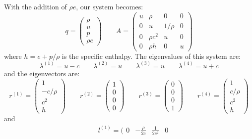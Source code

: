 \begin{itemize}
With the addition of $\rho e$, our system becomes:
\begin{equation}
q = \left ( \begin{array}{c} \rho \\ u \\ p \\ \rho e \end{array} \right )
%
\qquad
%
A = \left ( \begin{array}{cccc} u & \rho     & 0      & 0 \\
                                0 & u        & 1/\rho & 0 \\
                                0 & \rho c^2 & u      & 0 \\
                                0 & \rho h   & 0      & u 
            \end{array} \right )
\end{equation}
where $h = e + p/\rho$ is the specific enthalpy.  The eigenvalues of this 
system are:
\begin{equation}
\lambda^{(1)} = u - c \qquad 
\lambda^{(2)} = u  \qquad 
\lambda^{(3)} = u  \qquad 
\lambda^{(4)} = u + c 
\end{equation}
and the eigenvectors are:
\begin{equation}
r^{(1)} = \left ( \begin{array}{c} 1 \\ -c/\rho \\ c^2 \\ h \end{array} \right )
\qquad
r^{(2)} = \left ( \begin{array}{c} 1 \\ 0 \\ 0 \\ 0 \end{array} \right )
\qquad
r^{(3)} = \left ( \begin{array}{c} 0 \\ 0 \\ 0 \\ 1 \end{array} \right )
\qquad
r^{(4)} = \left ( \begin{array}{c} 1 \\ c/\rho \\ c^2 \\ h \end{array} \right )
\end{equation}
and
\begin{eqnarray}
&&
l^{(1)} = ( \begin{array}{cccc} 0 & -\frac{\rho}{2c} & \frac{1}{2c^2} & 0 

\end{array}
\end{eqnarray}
\end{itemize}

